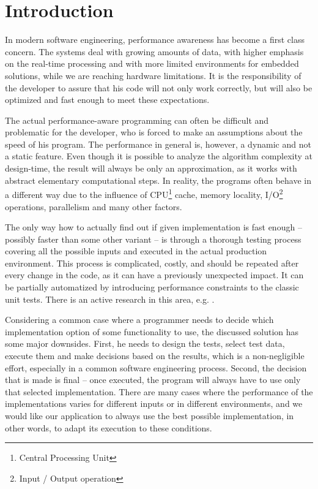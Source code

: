 \chapter*{Introduction}

In modern software engineering, performance awareness has become a first class concern. The systems deal with growing amounts of data, with higher emphasis on the real-time processing and with more limited environments for embedded solutions, while we are reaching hardware limitations. It is the responsibility of the developer to assure that his code will not only work correctly, but will also be optimized and fast enough to meet these expectations.

The actual performance-aware programming can often be difficult and problematic for the developer, who is forced to make an assumptions about the speed of his program. The performance in general is, however, a dynamic and not a static feature. Even though it is possible to analyze the algorithm complexity at design-time, the result will always be only an approximation, as it works with abstract elementary computational steps. In reality, the programs often behave in a different way due to the influence of CPU\footnote{Central Processing Unit} cache, memory locality, I/O\footnote{Input / Output operation} operations, parallelism and many other factors. 

The only way how to actually find out if given implementation is fast enough -- possibly faster than some other variant -- is through a thorough testing process covering all the possible inputs and executed in the actual production environment. This process is complicated, costly, and should be repeated after every change in the code, as it can have a previously unexpected impact. It can be partially automatized by introducing performance constraints to the classic unit tests. There is an active research in this area, e.g. \cite{bulej_capturing_2012,horky_performance_2013,horky_utilizing_2015}.

Considering a common case where a programmer needs to decide which implementation option of some functionality to use, the discussed solution has some major downsides. First, he needs to design the tests, select test data, execute them and make decisions based on the results, which is a non-negligible effort, especially in a common software engineering process. Second, the decision that is made is final -- once executed, the program will always have to use only that selected implementation. There are many cases where the performance of the implementations varies for different inputs or in different environments, and we would like our application to always use the best possible implementation, in other words, to adapt its execution to these conditions.

